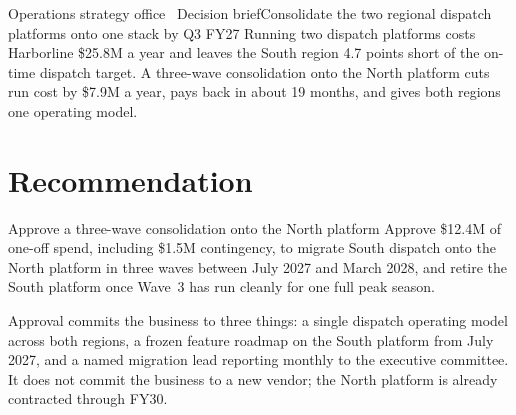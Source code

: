 %

\begin{briefheader}{Operations strategy office \textperiodcentered\ Decision brief}{Consolidate the two regional dispatch platforms onto one stack by Q3 FY27}
Running two dispatch platforms costs Harborline \$25.8M a year and leaves the
South region 4.7 points short of the on-time dispatch target. A three-wave
consolidation onto the North platform cuts run cost by \$7.9M a year, pays
back in about 19 months, and gives both regions one operating model.
\end{briefheader}

\section{Recommendation}

\begin{decisionpoint}{Approve a three-wave consolidation onto the North platform}
Approve \$12.4M of one-off spend, including \$1.5M contingency, to migrate
South dispatch onto the North platform in three waves between July 2027 and
March 2028, and retire the South platform once Wave~3 has run cleanly for one
full peak season.
\end{decisionpoint}

Approval commits the business to three things: a single dispatch operating
model across both regions, a frozen feature roadmap on the South platform
from July 2027, and a named migration lead reporting monthly to the executive
committee. It does not commit the business to a new vendor; the North
platform is already contracted through FY30.

